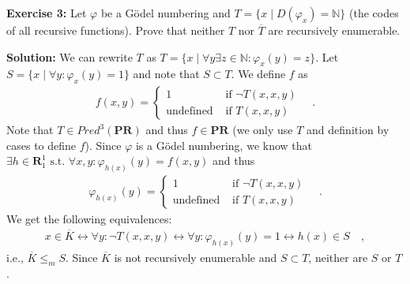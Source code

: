 \documentclass [11pt]{article}
\newcommand{\N}{\ensuremath{\mathbb{N}}}
\newcommand{\PR}{\textbf{PR}}
\newcommand{\R}{\textbf{R}}
\newcommand{\lra}{\ensuremath{\leftrightarrow}}
\begin{document}
\bigskip
\noindent
\textbf{Exercise 3:} Let $\varphi$ be a G\"odel numbering and $T = \{ x \mid D(\varphi_x) = \N\}$ (the codes of all recursive functions). Prove that neither $T$ nor $\overline{T}$ are recursively enumerable.

\noindent
\textbf{Solution:}
We can rewrite $T$ as $T = \{ x \mid \forall y \exists z\in\N: \varphi_x(y) = z \}$.
Let $S = \{x \mid \forall y: \varphi_x(y) = 1 \}$ and note that $S\subset T$.
We define $f$ as 
\begin{align*}
 f(x,y) = \begin{cases}
           1 & \text{ if } \neg T(x,x,y) \\
           \text{undefined} &\text{ if } T(x,x,y)
          \end{cases} \quad .
\end{align*} 
Note that $T \in Pred^3(\PR)$ and thus $f \in \PR$ (we only use $T$ and definition by cases to define $f$).
Since $\varphi$ is a G\"odel numbering, we know that $\exists h \in \R_1^1 \text{ s.t.\ } \forall x,y :\varphi_{h(x)}(y) = f(x,y)$ and thus
\begin{align*}
\varphi_{h(x)}(y) = \begin{cases}
           1 & \text{ if } \neg T(x,x,y) \\
           \text{undefined} &\text{ if } T(x,x,y)
          \end{cases} \quad .
\end{align*} 
We get the following equivalences:
\begin{align*}
x\in \overline{K} \lra \forall y: \neg T(x,x,y) \lra \forall y: \varphi_{h(x)}(y) = 1 \lra h(x) \in S \quad , 
\end{align*}
i.e., $\overline{K} \leq_m S$. 
Since $\overline{K}$ is not recursively enumerable and $S \subset T$, neither are  $S$ or $T$.
\end{document}
